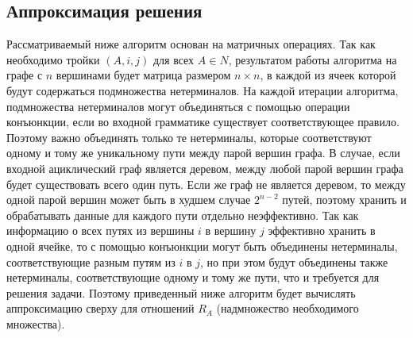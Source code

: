 \documentclass{spbau-diploma}
\begin{document}
\subsection{Аппроксимация решения}
Рассматриваемый ниже алгоритм основан на матричных операциях. Так как необходимо тройки $(A, i, j)$ для всех $A \in N$, результатом работы алгоритма  на графе с $n$ вершинами будет матрица размером $n \times n$, в каждой из ячеек которой будут содержаться подмножества нетерминалов. На каждой итерации алгоритма, подмножества нетерминалов могут объединяться с помощью операции конъюнкции, если во входной грамматике существует соответствующее правило. Поэтому важно объединять только те нетерминалы, которые соответствуют одному и тому же уникальному пути между парой вершин графа. В случае, если входной ациклический граф является деревом, между любой парой вершин графа будет существовать всего один путь. Если же граф не является деревом, то между одной парой вершин может быть в худшем случае $2^{n-2}$ путей, поэтому хранить и обрабатывать данные для каждого пути отдельно неэффективно. Так как информацию о всех путях из вершины $i$ в вершину $j$ эффективно хранить в одной ячейке, то с помощью конъюнкции могут быть объединены нетерминалы, соответствующие разным путям из $i$ в $j$, но при этом будут объединены также нетерминалы, соответствующие одному и тому же пути, что и требуется для решения задачи. Поэтому приведенный ниже алгоритм будет вычислять аппроксимацию сверху для отношений $R_A$ (надмножество необходимого множества).
\end{document}

